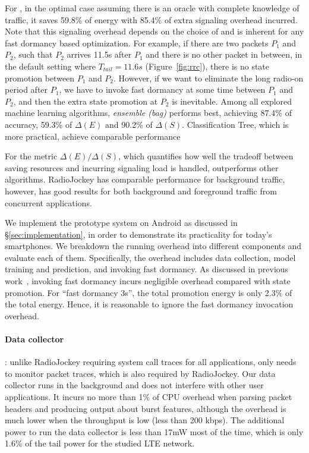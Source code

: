 For \NAME, in the optimal case assuming there is an oracle with complete knowledge of traffic, it saves 59.8\% of energy with 85.4\% of extra signaling overhead incurred. Note that this signaling overhead depends on the choice of \SBT and is inherent for any fast dormancy based optimization. For example, if there are two packets $P_{1}$ and $P_{2}$, such that $P_{2}$ arrives 11.5s after $P_{1}$ and there is no other packet in between, in the default setting where $T_{tail} = 11.6s$ (Figure~\ref{fig:rrc}), there is no state promotion between $P_{1}$ and $P_{2}$. However, if we want to eliminate the long radio-on period after $P_{1}$, we have to invoke fast dormancy at some time between $P_{1}$ and $P_{2}$, and then the extra state promotion at $P_{2}$ is inevitable. Among all explored machine learning algorithms, {\em ensemble (bag)} performs best, achieving 87.4\% of accuracy, 59.3\% of $\Delta(E)$ and 90.2\% of $\Delta(S)$. Classification Tree, which is more practical, achieve comparable performance

For the metric $\Delta(E)/\Delta(S)$, which quantifies how well the tradeoff between saving resources and incurring signaling load is handled, \NAME outperforms other algorithms. RadioJockey has comparable performance for background traffic, however, \NAME has good results for both background and foreground traffic from concurrent applications.

We implement the prototype \NAME system on Android as discussed in \S\ref{sec:implementation}, in order to demonstrate its practicality for today's smartphones. We  breakdown the running overhead into different components and evaluate each of them. Specifically, the overhead includes data collection, model training and prediction, and invoking fast dormancy. As discussed in previous work~\cite{radiojockey}, invoking fast dormancy incurs negligible overhead compared with state promotion. For ``fast dormancy 3s'', the total promotion energy is only 2.3\% of the total energy. Hence, it is reasonable to ignore the fast dormancy invocation overhead.

\paragraph{Data collector}: unlike RadioJockey requiring system call traces for all applications, \NAME only needs to monitor packet traces, which is also required by RadioJockey. Our data collector runs in the background and does not interfere with other user applications. It incurs no more than 1\% of CPU overhead when parsing packet headers and producing output about burst features, although the overhead is much lower when the throughput is low (\eg less than 200 kbps). The additional power to run the data collector is less than 17mW most of the time, which is only 1.6\% of the tail power for the studied LTE network.

